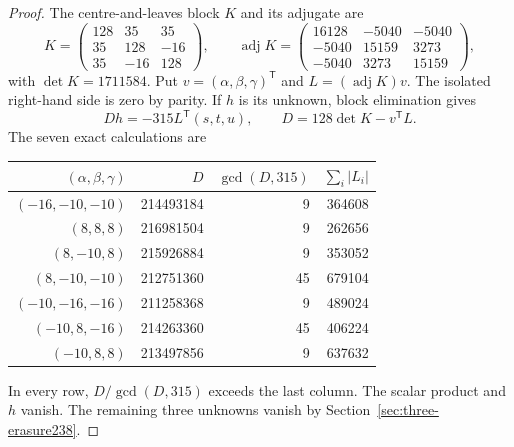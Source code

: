 \begin{proof}
The centre-and-leaves block $K$ and its adjugate are
\[
K=\begin{pmatrix}128&35&35\\35&128&-16\\35&-16&128\end{pmatrix},
\qquad
\operatorname{adj}K=
\begin{pmatrix}
16128&-5040&-5040\\-5040&15159&3273\\-5040&3273&15159
\end{pmatrix},
\]
with $\det K=1711584$. Put
$v=(\alpha,\beta,\gamma)^{\mathsf T}$ and $L=(\operatorname{adj}K)v$.
The isolated right-hand side is zero by parity. If $h$ is its unknown,
block elimination gives
\[
D h=-315L^{\mathsf T}(s,t,u),\qquad
D=128\det K-v^{\mathsf T}L.
\]
The seven exact calculations are
\begin{center}
\begin{tabular}{rrrr}
\toprule
$(\alpha,\beta,\gamma)$ & $D$ & $\gcd(D,315)$ & $\sum_i|L_i|$\\
\midrule
$(-16,-10,-10)$ & 214493184 & 9 & 364608\\
$(8,8,8)$ & 216981504 & 9 & 262656\\
$(8,-10,8)$ & 215926884 & 9 & 353052\\
$(8,-10,-10)$ & 212751360 & 45 & 679104\\
$(-10,-16,-16)$ & 211258368 & 9 & 489024\\
$(-10,8,-16)$ & 214263360 & 45 & 406224\\
$(-10,8,8)$ & 213497856 & 9 & 637632\\
\bottomrule
\end{tabular}
\end{center}
In every row, $D/\gcd(D,315)$ exceeds the last column. The scalar
product and $h$ vanish. The remaining three unknowns vanish by
Section~\ref{sec:three-erasure238}.


\end{proof}
